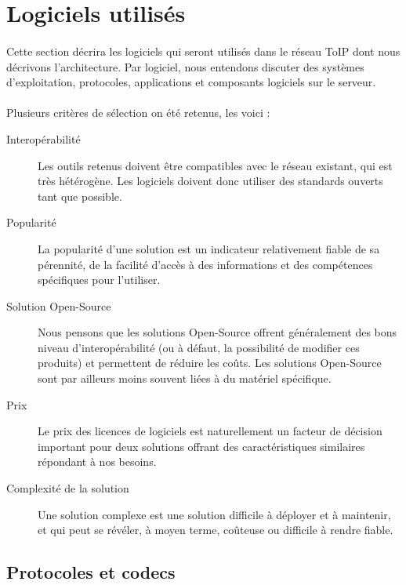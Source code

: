 \section{\label{logiciels}Logiciels utilisés}

\paragraph{} Cette section décrira les logiciels qui seront utilisés dans le
réseau ToIP dont nous décrivons l'architecture. Par logiciel, nous entendons
discuter des systèmes d'exploitation, protocoles, applications et composants
logiciels sur le serveur.

\paragraph{} Plusieurs critères de sélection on été retenus, les voici :
\begin{description}
	\item[Interopérabilité] Les outils retenus doivent être compatibles avec le
	réseau existant, qui est très hétérogène. Les logiciels doivent donc utiliser
	des standards ouverts tant que possible.
	\item[Popularité] La popularité d'une solution est un indicateur relativement
	fiable de sa pérennité, de la facilité d'accès à des informations et des
	compétences spécifiques pour l'utiliser.
	\item[Solution Open-Source] Nous pensons que les solutions Open-Source
	offrent généralement des bons niveau d'interopérabilité (ou à défaut, la
	possibilité de modifier ces produits) et permettent de réduire les coûts.
	Les solutions Open-Source sont par ailleurs moins souvent liées à du matériel
	spécifique.
	\item[Prix] Le prix des licences de logiciels est naturellement un facteur de
	décision important pour deux solutions offrant des caractéristiques similaires
	répondant à nos besoins.
	\item[Complexité de la solution] Une solution complexe est une solution
	difficile à déployer et à maintenir, et qui peut se révéler, à moyen
	terme, coûteuse ou difficile à rendre fiable.
\end{description}

\subsection{Protocoles et codecs}

